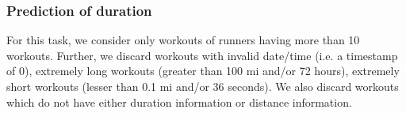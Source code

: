 \documentclass{acm_proc_article-sp}
\begin{document}

\subsubsection{Prediction of duration}

For this task, we consider only workouts of runners having more than 10 workouts. Further, we discard workouts with invalid date/time (i.e. a timestamp of 0), extremely long workouts (greater than 100 mi and/or 72 hours), extremely short workouts (lesser than 0.1 mi and/or 36 seconds). We also discard workouts which do not have either duration information or distance information.
\end{document}
